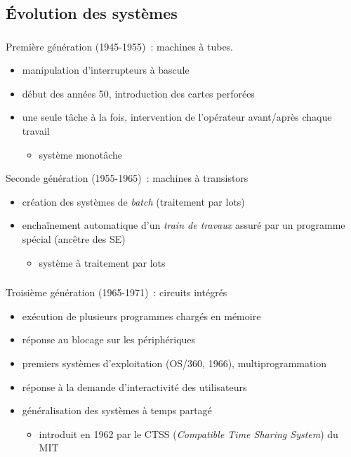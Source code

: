 \subsection{Évolution des systèmes}
\begin{frame}
  \frametitle{\insertsubsection}
  \alert{Première génération} (1945-1955)~: machines à tubes.
  \begin{itemize}
  \item manipulation d'interrupteurs à bascule 
  \item début des années 50, introduction des cartes perforées 
  \item une seule tâche à la fois, intervention de l'opérateur avant/après chaque
    travail      
    \begin{itemize}
    \item[\ding{212}] système \alert{monotâche}
    \end{itemize}
  \end{itemize}
  \vspace{0.5cm}
  \alert{Seconde génération} (1955-1965)~: machines à transistors
  \begin{itemize}
  \item création des systèmes de \emph{batch} (traitement par lots)
  \item enchaînement automatique d'un \emph{train de travaux}
    assuré par un programme spécial (ancêtre des SE)
    \begin{itemize}
    \item[\ding{212}] système à \alert{traitement par lots}
    \end{itemize}
  \end{itemize}
\end{frame}

\begin{frame}
  \frametitle{\insertsubsection}
  \alert{Troisième génération} (1965-1971)~: circuits intégrés
  \begin{itemize}
  \item exécution de plusieurs programmes chargés en mémoire
  \item réponse au blocage sur les périphériques  
  \item[\ding{212}] \alert{premiers systèmes d'exploitation} (OS/360, 1966), \alert{multiprogrammation}
  \end{itemize}
  \vspace{0.5cm}  
  \begin{itemize}
  \item réponse à la demande d'interactivité des utilisateurs 
  \item[\ding{212}] généralisation des systèmes à \alert{temps partagé}
    \begin{itemize}
    \item introduit en 1962 par le CTSS (\emph{Compatible Time Sharing System}) du MIT 
    \end{itemize}
\end{itemize}
\end{frame}

